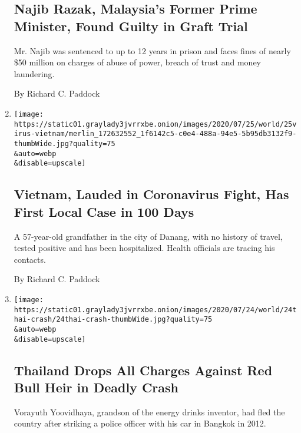 \begin{enumerate}
  \hypertarget{najib-razak-malaysias-former-prime-minister-found-guilty-in-graft-trial}{%
  \subsection{Najib Razak, Malaysia's Former Prime Minister, Found
  Guilty in Graft
  Trial}\label{najib-razak-malaysias-former-prime-minister-found-guilty-in-graft-trial}}

  Mr. Najib was sentenced to up to 12 years in prison and faces fines of
  nearly \$50 million on charges of abuse of power, breach of trust and
  money laundering.

  By Richard C. Paddock
\item
  \href{/2020/07/25/world/asia/coronavirus-vietnam.html}{}

  \texttt{[image: https://static01.graylady3jvrrxbe.onion/images/2020/07/25/world/25virus-vietnam/merlin\_172632552\_1f6142c5-c0e4-488a-94e5-5b95db3132f9-thumbWide.jpg?quality=75\\\&auto=webp\\\&disable=upscale]}

  \hypertarget{vietnam-lauded-in-coronavirus-fight-has-first-local-case-in-100-days}{%
  \subsection{Vietnam, Lauded in Coronavirus Fight, Has First Local Case
  in 100
  Days}\label{vietnam-lauded-in-coronavirus-fight-has-first-local-case-in-100-days}}

  A 57-year-old grandfather in the city of Danang, with no history of
  travel, tested positive and has been hospitalized. Health officials
  are tracing his contacts.

  By Richard C. Paddock
\item
  \href{/2020/07/24/world/asia/thailand-crash-red-bull-heir.html}{}

  \texttt{[image: https://static01.graylady3jvrrxbe.onion/images/2020/07/24/world/24thai-crash/24thai-crash-thumbWide.jpg?quality=75\\\&auto=webp\\\&disable=upscale]}

  \hypertarget{thailand-drops-all-charges-against-red-bull-heir-in-deadly-crash}{%
  \subsection{Thailand Drops All Charges Against Red Bull Heir in Deadly
  Crash}\label{thailand-drops-all-charges-against-red-bull-heir-in-deadly-crash}}

  Vorayuth Yoovidhaya, grandson of the energy drinks inventor, had fled
  the country after striking a police officer with his car in Bangkok in
  2012.


\end{enumerate}
